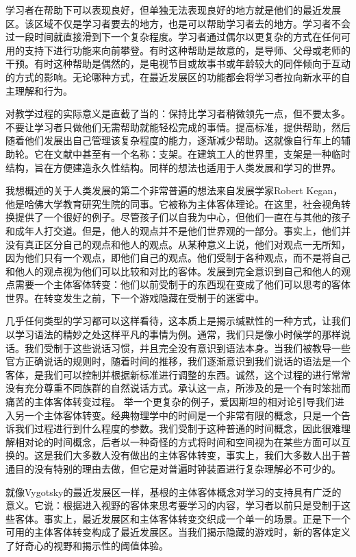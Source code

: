 学习者在帮助下可以表现良好，但单独无法表现良好的地方就是他们的最近发展区。该区域不仅是学习者要去的地方，也是可以帮助学习者去的地方。学习者不会过一段时间就直接滑到下一个复杂程度。学习者通过偶尔以更复杂的方式在任何可用的支持下进行功能来向前攀登。有时这种帮助是故意的，是导师、父母或老师的干预。有时这种帮助是偶然的，是电视节目或故事书或年龄较大的同伴倾向于互动的方式的影响。无论哪种方式，在最近发展区的功能都会将学习者拉向新水平的自主理解和行为。

对教学过程的实际意义是直截了当的：保持比学习者稍微领先一点，但不要太多。不要让学习者只做他们无需帮助就能轻松完成的事情。提高标准，提供帮助，然后随着他们发展出自己管理该复杂程度的能力，逐渐减少帮助。这就像自行车上的辅助轮。它在文献中甚至有一个名称：支架。在建筑工人的世界里，支架是一种临时结构，旨在方便建造永久性结构。同样的想法也适用于人类发展和学习的世界。

我想概述的关于人类发展的第二个非常普遍的想法来自发展学家Robert Kegan，他是哈佛大学教育研究生院的同事。它被称为主体客体理论。在这里，社会视角转换提供了一个很好的例子。尽管孩子们以自我为中心，但他们一直在与其他的孩子和成年人打交道。但是，他人的观点并不是他们世界观的一部分。事实上，他们并没有真正区分自己的观点和他人的观点。从某种意义上说，他们对观点一无所知，因为他们只有一个观点，即他们自己的观点。他们受制于各种观点，而不是将自己和他人的观点视为他们可以比较和对比的客体。发展到完全意识到自己和他人的观点需要一个主体客体转变：他们以前受制于的东西现在变成了他们可以思考的客体世界。在转变发生之前，下一个游戏隐藏在受制于的迷雾中。

几乎任何类型的学习都可以这样看待，这本质上是揭示缄默性的一种方式，让我们以学习语法的精妙之处这样平凡的事情为例。通常，我们只是像小时候学的那样说话。我们受制于这些说话习惯，并且完全没有意识到语法本身。当我们被教导一些官方正确说话的规则时，随着时间的推移，我们逐渐意识到我们说话的语法是一个客体，是我们可以控制并根据新标准进行调整的东西。诚然，这个过程的进行常常没有充分尊重不同族群的自然说话方式。承认这一点，所涉及的是一个有时笨拙而痛苦的主体客体转变过程。
举一个更复杂的例子，爱因斯坦的相对论引导我们进入另一个主体客体转变。经典物理学中的时间是一个非常有限的概念，只是一个告诉我们过程进行到什么程度的参数。我们受制于这种普通的时间概念，因此很难理解相对论的时间概念，后者以一种奇怪的方式将时间和空间视为在某些方面可以互换的。这是我们大多数人没有做出的主体客体转变，事实上，我们大多数人出于普通目的没有特别的理由去做，但它是对普遍时钟装置进行复杂理解必不可少的。

就像Vygotsky的最近发展区一样，基根的主体客体概念对学习的支持具有广泛的意义。它说：根据进入视野的客体来思考要学习的内容，学习者以前只是受制于这些客体。事实上，最近发展区和主体客体转变交织成一个单一的场景。正是下一个可用的主体客体转变构成了最近发展区。当我们揭示隐藏的游戏时，新的客体定义了好奇心的视野和揭示性的阈值体验。

